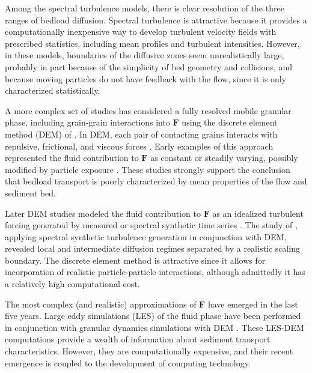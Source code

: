 Among the spectral turbulence models, there is clear resolution of the three ranges of bedload diffusion. Spectral turbulence is attractive because it provides a computationally inexpensive way to develop turbulent velocity fields with prescribed statistics, including mean profiles and turbulent intensities. However, in these models, boundaries of the diffusive zones seem unrealistically large, probably in part because of the simplicity of bed geometry and collisions, and because moving particles do not have feedback with the flow, since it is only characterized statistically. 
\bigskip 

A more complex set of studies has considered a fully resolved mobile granular phase, including grain-grain interactions into $\textbf{F}$ using the discrete element method (DEM) of \cite{Cundall1979}. In DEM, each pair of contacting grains interacts with repulsive, frictional, and viscous forces \citep{Dziugys2001}. Early examples of this approach represented the fluid contribution to $\textbf{F}$ as constant or steadily varying, possibly modified by particle exposure \citep{Jiang1993, Jefcoate1995, Jefcoate1997, McEwan2001, McEwan2004}. These studies strongly support the conclusion that bedload transport is poorly characterized by mean properties of the flow and sediment bed. 
\bigskip 

Later DEM studies modeled the fluid contribution to $\textbf{F}$ as an idealized turbulent forcing generated by measured \citep{Schmeeckle2003} or spectral synthetic time series \citep{Nikora2001a}. The study of \cite{Nikora2001a}, applying spectral synthetic turbulence generation in conjunction with DEM, revealed local and intermediate diffusion regimes separated by a realistic scaling boundary. The discrete element method is attractive since it allows for incorporation of realistic particle-particle interactions, although admittedly it has a relatively high computational cost.
\bigskip 

The most complex (and realistic) approximations of $\textbf{F}$ have emerged in the last five years. Large eddy simulations (LES) of the fluid phase have been performed in conjunction with granular dynamics simulations with DEM \citep{Schmeeckle2014, Schmeeckle2015,Sun2016, Liu2016,Elghannay2017, Elghannay2017a}. These LES-DEM computations provide a wealth of information about sediment transport characteristics. However, they are computationally expensive, and their recent emergence is coupled to the development of computing technology. 
\bigskip 

